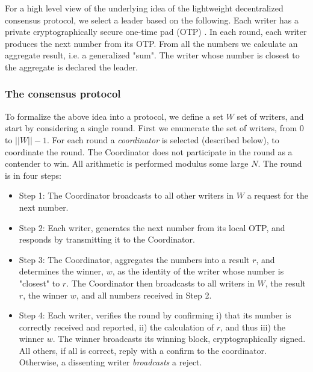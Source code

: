 \documentclass[10pt]{article}
\begin{document}
For a high level view of the underlying idea of the lightweight decentralized 
consensus protocol, we select a leader based on the following. Each writer has a private
cryptographically secure one-time pad (OTP) \cite{Vernam1926}. In each round, each writer 
produces the next number from its  OTP. From all the numbers we calculate 
an aggregate result, i.e. a generalized "sum". The writer whose number is 
closest to the aggregate is declared the leader.


\subsubsection*{The consensus protocol}
To formalize the above idea into a protocol, we define a set $W$ set of writers, and  start by considering a single round. First we enumerate the set of writers, from 0 to $||W|| - 1$. For each round a \emph{coordinator} is selected (described below), to coordinate the round. The Coordinator does not participate in the round as a contender to win. All arithmetic
is performed modulus some large $N$. The round is in four steps:
\begin{itemize}
    \item Step 1: The Coordinator broadcasts to all other writers in $W$ a request for the next number.
    \item Step 2: Each writer, generates the next number from its local OTP, and responds by transmitting it to the Coordinator.
    \item Step 3: The Coordinator, aggregates the numbers into a result $r$, and determines the winner, $w$, as the identity of the writer whose number is "closest" to $r$. The Coordinator then broadcasts to all writers in $W$, the result $r$, the winner $w$, and all numbers received in Step 2.
    \item Step 4: Each writer, verifies the round by confirming i) that its number is correctly received and reported, ii) the calculation of $r$, and thus iii) the winner $w$. The winner broadcasts its winning block, cryptographically signed. All others, if all is correct, reply with a confirm to the coordinator. Otherwise, a dissenting writer \emph{broadcasts} a reject.
\end{itemize}

\end{document}
